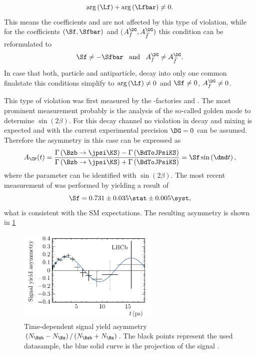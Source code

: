 \begin{equation}
	\arg\left(\Lf\right)+\arg\left(\Lfbar\right)\neq0. \label{eq:conditionCPV}
\end{equation}
This means the \CP coefficients \Cf and \Cfbar are not affected by this type of \CP violation, while for the coefficients $(\Sf, \Sfbar)$ and  ($A_f^{\DG}, A_{\kern 1.5pt\overline{\kern -1.5pt f\kern 1.5pt}}^{\DG})$ this condition can be reformulated to
\begin{equation}
\Sf\neq-\Sfbar\,\,\,\,\,\text{and}\,\,\,\,\,A_f^{\DG}\neq A_{\kern 1.5pt\overline{\kern -1.5pt f\kern 1.5pt}}^{\DG}.
\end{equation}
In case that both, particle and antiparticle, decay into only one common finalstate this conditions simplify to $\arg\left(\Lf\right)\neq0$ and $\Sf\neq0$, $A_f^{\DG}\neq0$.

This type of \CP violation was first measured by the \B-factories \babar \cite{Aubert:2001nu} and \belle \cite{Abe:2001xe}.
The most prominent measurement probably is the analysis of the so-called golden mode \BdToJPsiKS to determine $\sin\!\left(2\beta\right)$.
For this decay channel no \CP violation in decay and mixing is expected and with the current experimental precision $\DG=0$ can be assumed.
Therefore the \CP asymmetry in this case can be expressed as
\begin{equation}
A_{\CP}(t)=\frac{\Gamma\left(\Bzb\to\jpsi\KS\right)-\Gamma\left(\BdToJPsiKS\right)}{\Gamma\left(\Bzb\to\jpsi\KS\right)+\Gamma\left(\BdToJPsiKS\right)}=\Sf\sin\left(\dmd t\right),\label{eq:CPAsymBd2JpsiKS}
\end{equation}
where the parameter \Sf can be identified with $\sin{}\left(2\beta\right)$.
The most recent measurement of \Sf was performed by \lhcb \cite{Aaij:2015vza} yielding a result of
\begin{equation}
\Sf=0.731\pm0.035\stat\pm0.005\syst,
\end{equation}
what is consistent with the \ac{SM} expectations. The resulting \CP asymmetry is shown in \cref{fig:sin2beta}
\begin{figure}[tbp]
	\centering
	\includegraphics[width=0.6\textwidth]{03CPV/figs/InterferenceCPV.pdf}
	\caption{Time-dependent signal yield asymmetry $\left(N_{\Bzb}-N_{\Bz}\right)/\left(N_{\Bzb}+N_{\Bz}\right)$. The black points represent the used datasample, the blue solid curve is the projection of the signal \PDF.}
	\label{fig:sin2beta}
\end{figure}
